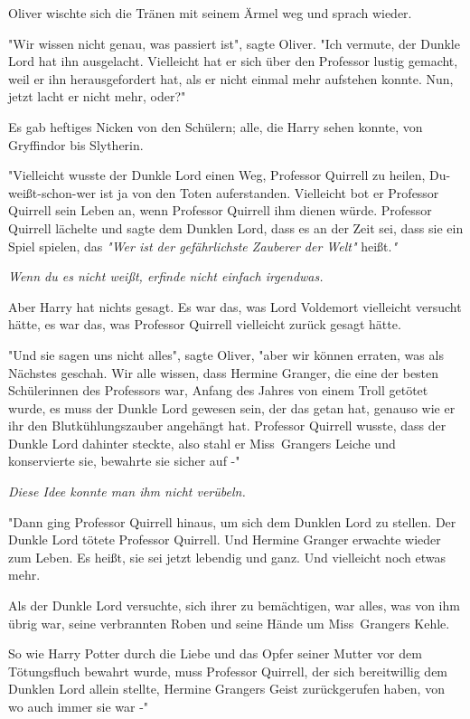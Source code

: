 {Oliver wischte sich die Tränen mit seinem Ärmel weg und sprach wieder.

"Wir wissen nicht genau, was passiert ist", sagte Oliver. "Ich vermute, der Dunkle Lord hat ihn ausgelacht. Vielleicht hat er sich über den Professor lustig gemacht, weil er ihn herausgefordert hat, als er nicht einmal mehr aufstehen konnte. Nun, jetzt lacht er nicht mehr, oder?"

Es gab heftiges Nicken von den Schülern; alle, die Harry sehen konnte, von Gryffindor bis Slytherin.

"Vielleicht wusste der Dunkle Lord einen Weg, Professor Quirrell zu heilen, Du-weißt-schon-wer ist ja von den Toten auferstanden. Vielleicht bot er Professor Quirrell sein Leben an, wenn Professor Quirrell ihm dienen würde. Professor Quirrell lächelte und sagte dem Dunklen Lord, dass es an der Zeit sei, dass sie ein Spiel spielen, das \emph{"Wer ist der gefährlichste Zauberer der Welt"} heißt.\emph{"}

\emph{Wenn du es nicht weißt, erfinde nicht einfach irgendwas.}

Aber Harry hat nichts gesagt. Es war das, was Lord Voldemort vielleicht versucht hätte, es war das, was Professor Quirrell vielleicht zurück gesagt hätte.

"Und sie sagen uns nicht alles", sagte Oliver, "aber wir können erraten, was als Nächstes geschah. Wir alle wissen, dass Hermine Granger, die eine der besten Schülerinnen des Professors war, Anfang des Jahres von einem Troll getötet wurde, es muss der Dunkle Lord gewesen sein, der das getan hat, genauso wie er ihr den Blutkühlungszauber angehängt hat. Professor Quirrell wusste, dass der Dunkle Lord dahinter steckte, also stahl er Miss~Grangers Leiche und konservierte sie, bewahrte sie sicher auf -"

\emph{Diese Idee konnte man ihm nicht verübeln.}

"Dann ging Professor Quirrell hinaus, um sich dem Dunklen Lord zu stellen. Der Dunkle Lord tötete Professor Quirrell. Und Hermine Granger erwachte wieder zum Leben. Es heißt, sie sei jetzt lebendig und ganz. Und vielleicht noch etwas mehr.

Als der Dunkle Lord versuchte, sich ihrer zu bemächtigen, war alles, was von ihm übrig war, seine verbrannten Roben und seine Hände um Miss~Grangers Kehle.

So wie Harry Potter durch die Liebe und das Opfer seiner Mutter vor dem Tötungsfluch bewahrt wurde, muss Professor Quirrell, der sich bereitwillig dem Dunklen Lord allein stellte, Hermine Grangers Geist zurückgerufen haben, von wo auch immer sie war -"

}
